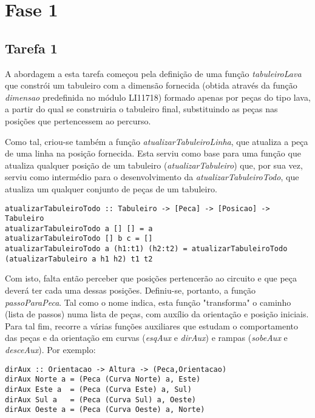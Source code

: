 \documentclass[a4paper]{report}
\begin{document}
\section{Fase 1}

\subsection{Tarefa 1}
\label{solucaotarefa1}

A abordagem a esta tarefa começou pela definição de uma função \textit{tabuleiroLava} que constrói um tabuleiro com a dimensão fornecida (obtida através da função \textit{dimensao} predefinida no módulo LI11718) formado apenas por peças do tipo lava, a partir do qual se construiria o tabuleiro final, substituindo as peças nas posições que pertencessem ao percurso.

Como tal, criou-se também a função \textit{atualizarTabuleiroLinha}, que atualiza a peça de uma linha na posição fornecida. Esta serviu como base para uma função que atualiza qualquer posição de um tabuleiro (\textit{atualizarTabuleiro}) que, por sua vez, serviu como intermédio para o desenvolvimento da \textit{atualizarTabuleiroTodo}, que atualiza um qualquer conjunto de peças de um tabuleiro.

\begin{lstlisting}
atualizarTabuleiroTodo :: Tabuleiro -> [Peca] -> [Posicao] -> Tabuleiro
atualizarTabuleiroTodo a [] [] = a
atualizarTabuleiroTodo [] b c = []
atualizarTabuleiroTodo a (h1:t1) (h2:t2) = atualizarTabuleiroTodo (atualizarTabuleiro a h1 h2) t1 t2
\end{lstlisting}

Com isto, falta então perceber que posições pertencerão ao circuito e que peça deverá ter cada uma dessas posições. Definiu-se, portanto, a função \textit{passoParaPeca}. Tal como o nome indica, esta função "transforma" o caminho (lista de passos) numa lista de peças, com auxílio da orientação e posição iniciais. Para tal fim, recorre a várias funções auxiliares que estudam o comportamento das peças e da orientação em curvas (\textit{esqAux} e \textit{dirAux}) e rampas (\textit{sobeAux} e \textit{desceAux}). Por exemplo:

\begin{verbatim}
dirAux :: Orientacao -> Altura -> (Peca,Orientacao)
dirAux Norte a = (Peca (Curva Norte) a, Este)
dirAux Este a  = (Peca (Curva Este) a, Sul)
dirAux Sul a   = (Peca (Curva Sul) a, Oeste)
dirAux Oeste a = (Peca (Curva Oeste) a, Norte)
\end{verbatim}
\end{document}
